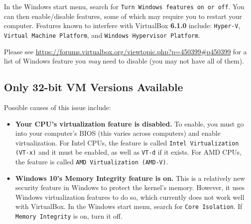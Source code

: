 \documentclass[11pt]{article}
\begin{document}
In the Windows start menu, search for \texttt{Turn Windows features on or off}. You can then enable/disable features, some of which may require you to restart your computer. Features known to interfere with VirtualBox \textbf{6.1.0} include: \texttt{Hyper-V}, \texttt{Virtual Machine Platform}, and \texttt{Windows Hypervisor Platform}.

Please see \url{https://forums.virtualbox.org/viewtopic.php?p=450399#p450399} for a list of Windows feature you \textit{may} need to disable (you may not have all of them).


\subsection{Only 32-bit VM Versions Available}
Possible causes of this issue include:
\begin{itemize}
    \item \textbf{Your CPU's virtualization feature is disabled.} To enable, you must go into your computer's BIOS (this varies across computers) and enable virtualization. For Intel CPUs, the feature is called \texttt{Intel Virtualization (VT-x)} and it must be enabled, as well as \texttt{VT-d} if it exists. For AMD CPUs, the feature is called \texttt{AMD Virtualization (AMD-V)}.
    \item \textbf{Windows 10's Memory Integrity feature is on.} This is a relatively new security feature in Windows to protect the kernel's memory. However, it uses Windows virtualization features to do so, which currently does not work well with VirtualBox. In the Windows start menu, search for \texttt{Core Isolation}. If \texttt{Memory Integrity} is on, turn it off.
\end{itemize}
\end{document}
